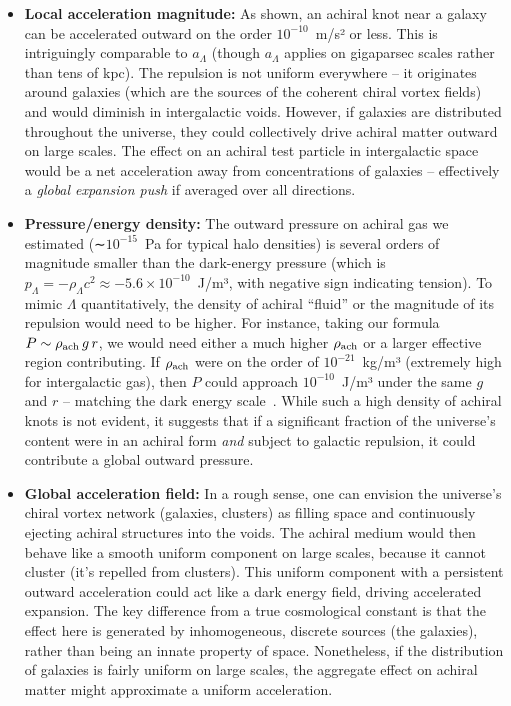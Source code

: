 \documentclass[11pt]{article}
\begin{document}
\begin{itemize}
\item
\textbf{Local acceleration magnitude:} As shown, an achiral knot near a galaxy can be accelerated outward on the order $10^{-10}$~m/s² or less. This is intriguingly comparable to $a_\Lambda$ (though $a_\Lambda$ applies on gigaparsec scales rather than tens of kpc). The repulsion is not uniform everywhere – it originates around galaxies (which are the sources of the coherent chiral vortex fields) and would diminish in intergalactic voids. However, if galaxies are distributed throughout the universe, they could collectively drive achiral matter outward on large scales. The effect on an achiral test particle in intergalactic space would be a net acceleration away from concentrations of galaxies – effectively a \textit{global expansion push} if averaged over all directions.

\item
\textbf{Pressure/energy density:} The outward pressure on achiral gas we estimated (∼$10^{-15}$~Pa for typical halo densities) is several orders of magnitude smaller than the dark-energy pressure (which is $p_\Lambda = -\rho_\Lambda c^2 \approx -5.6\times10^{-10}$~J/m³, with negative sign indicating tension). To mimic $\Lambda$ quantitatively, the density of achiral “fluid” or the magnitude of its repulsion would need to be higher. For instance, taking our formula $P \sim \rho_{\rm ach} \, g \, r$, we would need either a much higher $\rho_{\rm ach}$ or a larger effective region contributing. If $\rho_{\rm ach}$ were on the order of $10^{-21}$~kg/m³ (extremely high for intergalactic gas), then $P$ could approach $10^{-10}$~J/m³ under the same $g$ and $r$ – matching the dark energy scale~\cite{knot_theroy_in_fluid}. While such a high density of achiral knots is not evident, it suggests that if a significant fraction of the universe’s content were in an achiral form \textit{and} subject to galactic repulsion, it could contribute a global outward pressure.

\item
\textbf{Global acceleration field:} In a rough sense, one can envision the universe’s chiral vortex network (galaxies, clusters) as filling space and continuously ejecting achiral structures into the voids. The achiral medium would then behave like a smooth uniform component on large scales, because it cannot cluster (it’s repelled from clusters). This uniform component with a persistent outward acceleration could act like a dark energy field, driving accelerated expansion. The key difference from a true cosmological constant is that the effect here is generated by inhomogeneous, discrete sources (the galaxies), rather than being an innate property of space. Nonetheless, if the distribution of galaxies is fairly uniform on large scales, the aggregate effect on achiral matter might approximate a uniform acceleration.
\end{itemize}
\end{document}
